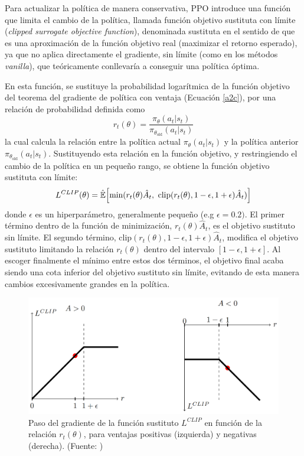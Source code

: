 \newpage

Para actualizar la política de manera conservativa, PPO introduce una función que limita el cambio de la política, llamada función objetivo sustituta con límite (\emph{clipped surrogate objective function}), denominada sustituta en el sentido de que es una aproximación de la función objetivo real (maximizar el retorno esperado), ya que no aplica directamente el gradiente, sin límite (como en los métodos \emph{vanilla}), que teóricamente conllevaría a conseguir una política óptima.

En esta función, se sustituye la probabilidad logarítmica de la función objetivo del teorema del gradiente de política con ventaja (Ecuación \ref{a2c}), por una relación de probabilidad definida como
\begin{equation}
    r_t(\theta) = \frac{\pi_\theta(a_t|s_t)}{\pi_{\theta_{\text{old}}}(a_t|s_t)}
\end{equation}
la cual calcula la relación entre la política actual $\pi_\theta(a_t|s_t)$ y la política anterior $\pi_{\theta_{\text{old}}}(a_t|s_t)$. Sustituyendo esta relación en la función objetivo, y restringiendo el cambio de la política en un pequeño rango, se obtiene la función objetivo sustituta con límite:
\begin{equation}
    L^{CLIP}(\theta) = \hat{\mathbb{E}}\Bigl[\min(r_t(\theta)\hat{A}_t,\text{ clip}(r_t(\theta), 1-\epsilon, 1+\epsilon)\hat{A}_t)\Bigr]
\end{equation}
donde $\epsilon$ es un hiperparámetro, generalmente pequeño (e.g $\epsilon=0\text{.}2)$. El primer término dentro de la función de minimización, $r_t(\theta)\hat{A}_t$, es el objetivo sustituto sin límite. El segundo término, $\text{clip}(r_t(\theta), 1-\epsilon, 1+\epsilon)\hat{A}_t$, modifica el objetivo sustituto limitando la relación $r_t(\theta)$ dentro del intervalo $[1-\epsilon, 1+\epsilon]$. Al escoger finalmente el mínimo entre estos dos términos, el objetivo final acaba siendo una cota inferior del objetivo sustituto sin límite, evitando de esta manera cambios excesivamente grandes en la política.

\begin{figure}[H]
    \centering
    \includegraphics[width=12.5cm]{figures/ppo.png}
    \caption[Gradiente de la función sustituto $L^{CLIP}$]{Paso del gradiente de la función sustituto $L^{CLIP}$ en función de la relación $r_t(\theta)$, para ventajas positivas (izquierda) y negativas (derecha). (Fuente: \cite{schulman2017proximal})}
    \label{fig:ppo}
\end{figure}

